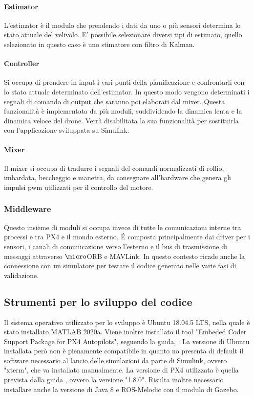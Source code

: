 \paragraph{Estimator}
L'estimator è il modulo che prendendo i dati da uno o più sensori determina lo stato attuale del velivolo. E' possibile selezionare diversi tipi di estimato, quello selezionato in questo caso è uno stimatore con filtro di Kalman.
\paragraph{Controller}
Si occupa di prendere in input i vari punti della pianificazione e confrontarli con lo stato attuale determinato dell'estimator. In questo modo vengono determinati i segnali di comando di output che saranno poi elaborati dal mixer. Questa funzionalità è implementata da più moduli, suddividendo la dinamica lenta e la dinamica veloce del drone. Verrà disabilitata la sua funzionalità per sostituirla con l'applicazione sviluppata su Simulink.
\paragraph{Mixer}
Il mixer si occupa di tradurre i segnali del comandi normalizzati di rollio, imbardata, beccheggio e manetta, da consegnare all'hardware che genera gli impulsi pwm utilizzati per il controllo del motore.
\subsubsection{Middleware}
Questo insieme di moduli si occupa invece di tutte le comunicazioni interne tra processi e tra PX4 e il mondo esterno. \'E composta principalmente dai driver per i sensori, i canali di comunicazione verso l'esterno e il bus di trasmissione di messaggi attraverso $\micro$ORB e MAVLink. In questo contesto ricade anche  la connessione con un simulatore per testare il codice generato nelle varie fasi di validazione.
\subsection{Strumenti per lo sviluppo del codice}
Il sistema operativo utilizzato per lo sviluppo è Ubuntu 18.04.5 LTS, nella quale è stato installato MATLAB 2020a. Viene inoltre installato il tool "Embeded Coder Support Package for PX4 Autopilots", seguendo la guida, \cite{PX4MATLAB}. La versione di Ubuntu  installata però non è pienamente compatibile in quanto no presenta di default il software necessario al lancio delle simulazioni da parte di Simulink, ovvero "xterm", che va installato manualmente. La versione di PX4 utilizzata è quella prevista dalla guida \cite{PX4MATLAB}, ovvero la versione "1.8.0". Risulta inoltre necessario installare anche la versione di Java 8 e ROS-Melodic con il modulo di Gazebo.

